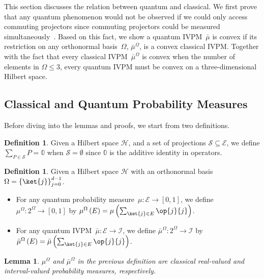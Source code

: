 \documentclass[12pt]{iopart}
\theoremstyle{plain}
\newtheorem{lemma}[thm]{Lemma}
\theoremstyle{definition}
\newtheorem{definition}[thm]{Definition}
\theoremstyle{remark}
\newcommand{\Hilb}{\mathcal{H}}
\newcommand{\events}{\ensuremath{\mathcal{E}}}
\newcommand{\proj}[1]{\op{#1}{#1}}
\begin{document}
This section discusses the relation between quantum and classical.
We first prove that any quantum phenomenon would not be observed if
we could only access commuting projectors since commuting projectors
could be measured simultaneously~\cite{Mermin_1993}. Based on this
fact, we show a quantum IVPM~$\bar{\mu}$ is convex if its restriction
on any orthonormal basis~$\Omega$, $\bar{\mu}^{\Omega}$, is a convex
classical IVPM. Together with the fact that every classical IVPM~$\bar{\mu}^{\Omega}$
is convex when the number of elements in $\Omega\le3$, every quantum
IVPM must be convex on a three-dimensional Hilbert space. 

\subsection{Classical and Quantum Probability Measures}

Before diving into the lemmas and proofs, we start from two definitions.

\begin{definition}Given a Hilbert space $\Hilb$, and a set of projections
$\mathcal{S}\subseteq\events$, we define $\sum_{P\in\mathcal{S}}P=\mathbb{0}$
when $\mathcal{S}=\emptyset$ since $\mathbb{0}$ is the additive
identity in operators.\end{definition}

\begin{definition}\label{definition:quantum-classical}Given a Hilbert
space $\Hilb$ with an orthonormal basis~$\Omega=\left\{ \ket{j}\right\} _{j=0}^{d-1}$.
\begin{itemize}
\item For any quantum probability measure~$\mu:\events\rightarrow\left[0,1\right]$,
we define $\mu^{\Omega}:2^{\Omega}\rightarrow\left[0,1\right]$ by
$\mu^{\Omega}\left(E\right)=\mu\left(\sum_{\ket{j}\in E}\proj{j}\right)$.
\item For any quantum IVPM~$\bar{\mu}:\events\rightarrow\mathscr{I}$,
we define $\bar{\mu}^{\Omega}:2^{\Omega}\rightarrow\mathscr{I}$ by
$\bar{\mu}^{\Omega}\left(E\right)=\bar{\mu}\left(\sum_{\ket{j}\in E}\proj{j}\right)$.
\end{itemize}
\end{definition}

\begin{lemma}\label{lemma:classical-probability-measures}$\mu^{\Omega}$
and $\bar{\mu}^{\Omega}$ in the previous definition are classical
real-valued and interval-valued probability measures, respectively.\end{lemma}
\end{document}
